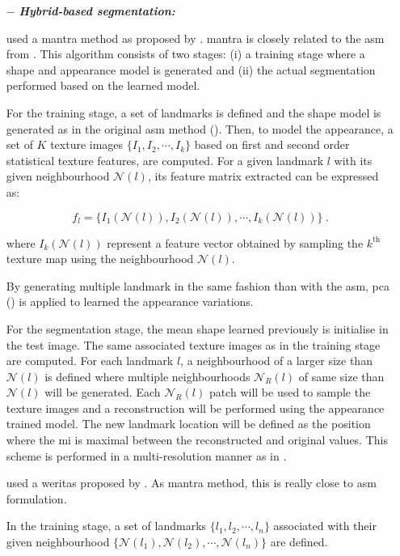 \begin{enumerate}[leftmargin=*]
\item[$-$] \textbf{\textit{Hybrid-based segmentation:}} 

\cite{Viswanath2008a,Viswanath2009} used a \ac{mantra} method as proposed by \cite{Toth2008}. \ac{mantra} is closely related to the \ac{asm} from \cite{Cootes1995}. This algorithm consists of two stages: (i) a training stage where a shape and appearance model is generated and (ii) the actual segmentation performed based on the learned model. 

For the training stage, a set of landmarks is defined and the shape model is generated as in the original \ac{asm} method (\cite{Cootes1995}). Then, to model the appearance, a set of $K$ texture images $\{I_1,I_2,\cdots,I_k\}$ based on first and second order statistical texture features, are computed. For a given landmark $l$ with its given neighbourhood $\mathcal{N}(l)$, its feature matrix extracted can be expressed as:

\begin{equation}
	f_l = \{ I_1(\mathcal{N}(l)), I_2(\mathcal{N}(l)), \cdots, I_k(\mathcal{N}(l)) \} \ .	
	\label{eq:mantra1}
\end{equation}

\noindent where $I_k(\mathcal{N}(l))$ represent a feature vector obtained by sampling the $k^{\text{th}}$ texture map using the neighbourhood $\mathcal{N}(l)$.

By generating multiple landmark in the same fashion than with the \ac{asm}, \ac{pca} (\cite{Pearson1901}) is applied to learned the appearance variations. 

For the segmentation stage, the mean shape learned previously is initialise in the test image. The same associated texture images as in the training stage are computed. For each landmark $l$, a neighbourhood of a larger size than $\mathcal{N}(l)$ is defined where multiple neighbourhoods $\mathcal{N}_R(l)$ of same size than $\mathcal{N}(l)$ will be generated. Each $\mathcal{N}_R(l)$ patch will be used to sample the texture images and a reconstruction will be performed using the appearance trained model. The new landmark location will be defined as the position where the \ac{mi} is maximal between the reconstructed and original values. This scheme is performed in a multi-resolution manner as in \cite{Cootes1995}.

\cite{Viswanath2012} used a \ac{weritas} proposed by \cite{Toth2009}. As \ac{mantra} method, this is really close to \ac{asm} formulation. 

In the training stage, a set of landmarks $\{l_1,l_2,\cdots,l_n\}$ associated with their given neighbourhood $\{\mathcal{N}(l_1),\mathcal{N}(l_2),\cdots,\mathcal{N}(l_n)\}$ are defined. 


\end{enumerate}
